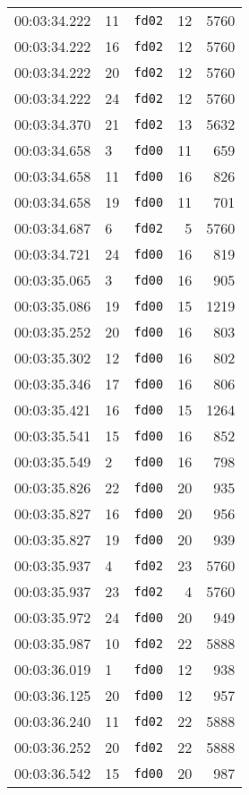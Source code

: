 \documentclass{article}
\begin{document}
\begin{longtable}{lllrr}
00:03:34.222 & 11 & \texttt{fd02} & 12 & 5760 \\
00:03:34.222 & 16 & \texttt{fd02} & 12 & 5760 \\
00:03:34.222 & 20 & \texttt{fd02} & 12 & 5760 \\
00:03:34.222 & 24 & \texttt{fd02} & 12 & 5760 \\
00:03:34.370 & 21 & \texttt{fd02} & 13 & 5632 \\
00:03:34.658 & 3 & \texttt{fd00} & 11 & 659 \\
00:03:34.658 & 11 & \texttt{fd00} & 16 & 826 \\
00:03:34.658 & 19 & \texttt{fd00} & 11 & 701 \\
00:03:34.687 & 6 & \texttt{fd02} & 5 & 5760 \\
00:03:34.721 & 24 & \texttt{fd00} & 16 & 819 \\
00:03:35.065 & 3 & \texttt{fd00} & 16 & 905 \\
00:03:35.086 & 19 & \texttt{fd00} & 15 & 1219 \\
00:03:35.252 & 20 & \texttt{fd00} & 16 & 803 \\
00:03:35.302 & 12 & \texttt{fd00} & 16 & 802 \\
00:03:35.346 & 17 & \texttt{fd00} & 16 & 806 \\
00:03:35.421 & 16 & \texttt{fd00} & 15 & 1264 \\
00:03:35.541 & 15 & \texttt{fd00} & 16 & 852 \\
00:03:35.549 & 2 & \texttt{fd00} & 16 & 798 \\
00:03:35.826 & 22 & \texttt{fd00} & 20 & 935 \\
00:03:35.827 & 16 & \texttt{fd00} & 20 & 956 \\
00:03:35.827 & 19 & \texttt{fd00} & 20 & 939 \\
00:03:35.937 & 4 & \texttt{fd02} & 23 & 5760 \\
00:03:35.937 & 23 & \texttt{fd02} & 4 & 5760 \\
00:03:35.972 & 24 & \texttt{fd00} & 20 & 949 \\
00:03:35.987 & 10 & \texttt{fd02} & 22 & 5888 \\
00:03:36.019 & 1 & \texttt{fd00} & 12 & 938 \\
00:03:36.125 & 20 & \texttt{fd00} & 12 & 957 \\
00:03:36.240 & 11 & \texttt{fd02} & 22 & 5888 \\
00:03:36.252 & 20 & \texttt{fd02} & 22 & 5888 \\
00:03:36.542 & 15 & \texttt{fd00} & 20 & 987 \\

\end{longtable}
\end{document}
